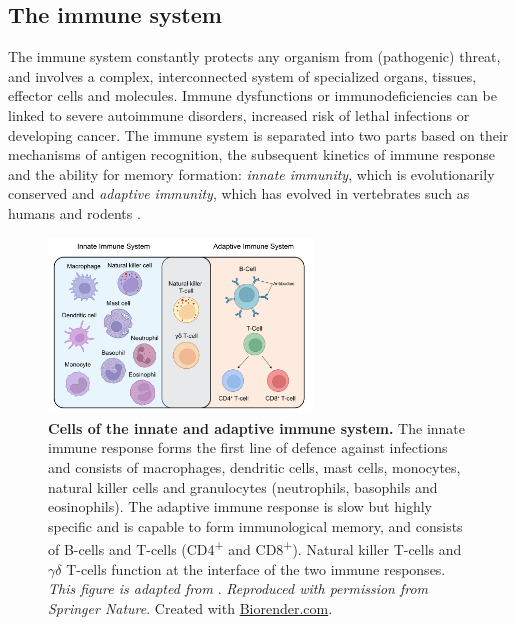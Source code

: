 
\subsection{The immune system}

\par The immune system constantly protects any organism from (pathogenic) threat, and involves a complex, interconnected system of specialized organs, tissues, effector cells and molecules. Immune dysfunctions or immunodeficiencies can be linked to severe autoimmune disorders, increased risk of lethal infections or developing cancer. The immune system is separated into two parts based on their mechanisms of antigen recognition, the subsequent kinetics of immune response and the ability for memory formation: \textit{innate immunity}, which is evolutionarily conserved and \textit{adaptive immunity}, which has evolved in vertebrates such as humans and rodents \textbf{\cite{orange_natural_2013,murphy_janeways_2017}}.\\


\begin{figure}
    \centering
    \includegraphics[width=7cm]{Chapter1/Fig/F1-15-01.png}
    \caption[Cells of the immune system]{\textbf{Cells of the innate and adaptive immune system.} The innate immune response forms the first line of defence against infections and consists of macrophages, dendritic cells, mast cells, monocytes, natural killer cells and granulocytes (neutrophils, basophils and eosinophils). The adaptive immune response is slow but highly specific and is capable to form immunological memory, and consists of B-cells and T-cells (CD4\textsuperscript{+} and CD8\textsuperscript{+}). Natural killer T-cells and $\gamma\delta$ T-cells function at the interface of the two immune responses. \textit{This figure is adapted from} \textbf{\cite{dranoff_cytokines_2004}}.\textit{ Reproduced with permission from Springer Nature}. Created with \href{https://www.biorender.com/}{Biorender.com}.}
    \label{fig:chp1_immunesystem}
\end{figure}

